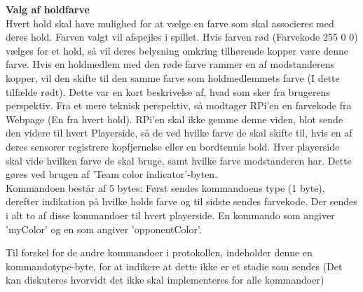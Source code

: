 \documentclass[Arkitektur/System_main.tex]{subfiles}
\begin{document}
\newpage
\textbf{Valg af holdfarve}
\\Hvert hold skal have mulighed for at vælge en farve som skal associeres med deres hold. Farven valgt vil afspejles i spillet. Hvis farven rød (Farvekode 255 0 0) vælges for et hold, så vil deres belysning omkring tilhørende kopper være denne farve. Hvis en holdmedlem med den røde farve rammer en af modstanderens kopper, vil den skifte til den samme farve som holdmedlemmets farve (I dette tilfælde rødt). Dette var en kort beskrivelse af, hvad som sker fra brugerens perspektiv. Fra et mere teknisk perspektiv, så modtager RPi'en en farvekode fra Webpage (En fra hvert hold). RPi'en skal ikke gemme denne viden, blot sende den videre til hvert Playerside, så de ved hvilke farve de skal skifte til, hvis en af deres sensorer registrere kopfjernelse eller en bordtennis bold. Hver playerside skal vide hvilken farve de skal bruge, samt hvilke farve modstanderen har. Dette gøres ved brugen af 'Team color indicator'-byten. 
\\Kommandoen består af 5 bytes: Først sendes kommandoens type (1 byte), derefter indikation på hvilke holds farve og til sidste sendes farvekode. Der sendes i alt to af disse kommandoer til hvert playerside. En kommando som angiver 'myColor' og en som angiver 'opponentColor'. 
\begin{table}[H]
\end{table}
Til forskel for de andre kommandoer i protokollen, indeholder denne en kommandotype-byte, for at indikere at dette ikke er et stadie som sendes (Det kan diskuteres hvorvidt det ikke skal implementeres for alle kommandoer)
\end{document}
